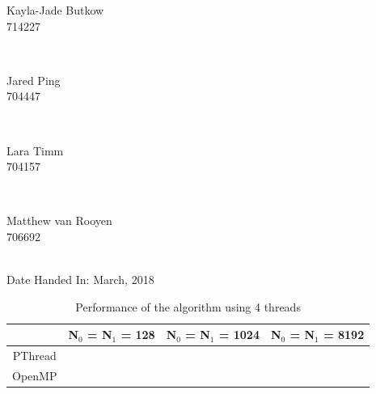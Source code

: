 \documentclass[10pt,twocolumn]{witseiepaper}
\begin{document}
\begin{titlepage}
		
		\begin{minipage}{0.4\textwidth}
			\begin{flushleft} \large
				Kayla-Jade Butkow \\ 714227 %
			\end{flushleft}
		\end{minipage}
		~
		\begin{minipage}{0.4\textwidth}
			\begin{flushright} \large
				Jared Ping \\ 704447
			\end{flushright}
		\end{minipage}\\[1cm]
		
		\begin{minipage}{0.4\textwidth}
			\begin{flushleft} \large
				Lara Timm \\ 704157
			\end{flushleft}
		\end{minipage}
		~
		\begin{minipage}{0.4\textwidth}
			\begin{flushright} \large
				Matthew van Rooyen \\ 706692
			\end{flushright}
		\end{minipage}\\[1cm]
		
		
		
		{\large Date Handed In:  March, 2018}\\[1cm] 
		
	\end{titlepage}


\pagestyle{plain}
\setcounter{page}{1}
\onecolumn
%
\begin{table}[h]
		\centering
\caption{Performance of the algorithm using 4 threads}
\begin{tabular}{|c|c|c|c|}
	\hline 
	 & N$_{0}$ = N$_{1}$ = 128 &  N$_{0}$ = N$_{1}$ = 1024 & N$_{0}$ = N$_{1}$ = 8192 \\ 
	\hline 
	PThread &  &  &  \\ 
	\hline 
	OpenMP &  &  &  \\ 
	\hline 
\end{tabular}
\end{table} 
\end{document}
